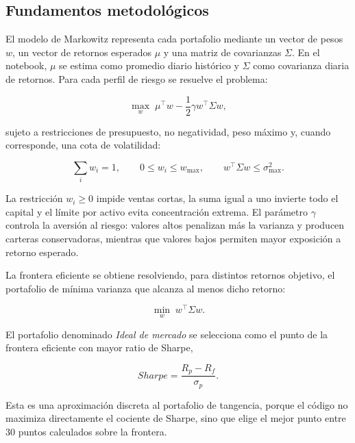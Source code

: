 \subsection*{Fundamentos metodol\'ogicos}

El modelo de Markowitz representa cada portafolio mediante un vector de pesos
$w$, un vector de retornos esperados $\mu$ y una matriz de covarianzas
$\Sigma$. En el notebook, $\mu$ se estima como promedio diario hist\'orico y
$\Sigma$ como covarianza diaria de retornos. Para cada perfil de riesgo se
resuelve el problema:

\begin{equation}
\max_w \; \mu^\top w - \frac{1}{2}\gamma w^\top \Sigma w,
\end{equation}

sujeto a restricciones de presupuesto, no negatividad, peso m\'aximo y, cuando
corresponde, una cota de volatilidad:

\begin{equation}
\sum_i w_i = 1, \qquad 0 \leq w_i \leq w_{\max}, \qquad
w^\top \Sigma w \leq \sigma^2_{\max}.
\end{equation}

La restricci\'on $w_i \geq 0$ impide ventas cortas, la suma igual a uno invierte
todo el capital y el l\'imite por activo evita concentraci\'on extrema. El
par\'ametro $\gamma$ controla la aversi\'on al riesgo: valores altos penalizan
m\'as la varianza y producen carteras conservadoras, mientras que valores bajos
permiten mayor exposici\'on a retorno esperado.

La frontera eficiente se obtiene resolviendo, para distintos retornos objetivo,
el portafolio de m\'inima varianza que alcanza al menos dicho retorno:

\begin{equation}
\min_w \; w^\top \Sigma w.
\end{equation}

El portafolio denominado \textit{Ideal de mercado} se selecciona como el punto
de la frontera eficiente con mayor ratio de Sharpe,

\begin{equation}
Sharpe = \frac{R_p - R_f}{\sigma_p}.
\end{equation}

Esta es una aproximaci\'on discreta al portafolio de tangencia, porque el c\'odigo
no maximiza directamente el cociente de Sharpe, sino que elige el mejor punto
entre 30 puntos calculados sobre la frontera.

